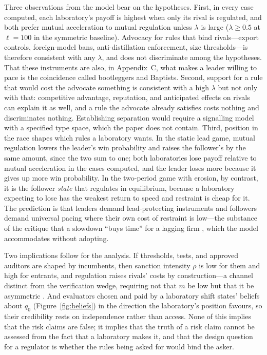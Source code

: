\documentclass[11pt]{article}
\theoremstyle{plain}
\theoremstyle{definition}
\theoremstyle{remark}
\begin{document}
Three observations from the model bear on the hypotheses. First, in every case computed, each laboratory's payoff is highest when only its rival is regulated, and both prefer mutual acceleration to mutual regulation unless $\lambda$ is large ($\lambda\ge0.5$ at $\ell=100$ in the symmetric baseline). Advocacy for rules that bind rivals---export controls, foreign-model bans, anti-distillation enforcement, size thresholds---is therefore consistent with any $\lambda$, and does not discriminate among the hypotheses. That these instruments are also, in Appendix~C, what makes a leader willing to pace is the coincidence \citet{yandle1983} called bootleggers and Baptists. Second, support for a rule that would cost the advocate something is consistent with a high $\lambda$ but not only with that: competitive advantage, reputation, and anticipated effects on rivals can explain it as well, and a rule the advocate already satisfies costs nothing and discriminates nothing. Establishing separation would require a signalling model with a specified type space, which the paper does not contain. Third, position in the race shapes which rules a laboratory wants. In the static lead game, mutual regulation lowers the leader's win probability and raises the follower's by the same amount, since the two sum to one; both laboratories lose payoff relative to mutual acceleration in the cases computed, and the leader loses more because it gives up more win probability. In the two-period game with erosion, by contrast, it is the follower \emph{state} that regulates in equilibrium, because a laboratory expecting to lose has the weakest return to speed and restraint is cheap for it. The prediction is that leaders demand lead-protecting instruments and followers demand universal pacing where their own cost of restraint is low---the substance of the critique that a slowdown ``buys time'' for a lagging firm \citep{eastern2026}, which the model accommodates without adopting.

Two implications follow for the analysis. If thresholds, tests, and approved auditors are shaped by incumbents, then sanction intensity $\rho$ is low for them and high for entrants, and regulation raises rivals' costs by construction---a channel distinct from the verification wedge, requiring not that $m$ be low but that it be asymmetric \citep{salop1983}. And evaluators chosen and paid by a laboratory shift states' beliefs about $q_0$ (Figure~\ref{fig:beliefs}) in the direction the laboratory's position favours, so their credibility rests on independence rather than access. None of this implies that the risk claims are false; it implies that the truth of a risk claim cannot be assessed from the fact that a laboratory makes it, and that the design question for a regulator is whether the rules being asked for would bind the asker.
\end{document}
